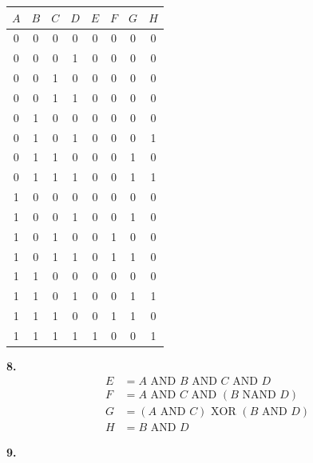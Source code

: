 \documentclass{article}
\begin{document}
    \begin{center}\begin{tabular}{| c | c | c | c | c | c | c | c |}
        \hline
        $A$ & $B$ & $C$ & $D$ & $E$ & $F$ & $G$ & $H$ \\
        \hline
        0 & 0 & 0 & 0 & 0 & 0 & 0 & 0 \\
        0 & 0 & 0 & 1 & 0 & 0 & 0 & 0 \\
        0 & 0 & 1 & 0 & 0 & 0 & 0 & 0 \\
        0 & 0 & 1 & 1 & 0 & 0 & 0 & 0 \\
        0 & 1 & 0 & 0 & 0 & 0 & 0 & 0 \\
        0 & 1 & 0 & 1 & 0 & 0 & 0 & 1 \\
        0 & 1 & 1 & 0 & 0 & 0 & 1 & 0 \\
        0 & 1 & 1 & 1 & 0 & 0 & 1 & 1 \\
        1 & 0 & 0 & 0 & 0 & 0 & 0 & 0 \\
        1 & 0 & 0 & 1 & 0 & 0 & 1 & 0 \\
        1 & 0 & 1 & 0 & 0 & 1 & 0 & 0 \\
        1 & 0 & 1 & 1 & 0 & 1 & 1 & 0 \\
        1 & 1 & 0 & 0 & 0 & 0 & 0 & 0 \\
        1 & 1 & 0 & 1 & 0 & 0 & 1 & 1 \\
        1 & 1 & 1 & 0 & 0 & 1 & 1 & 0 \\
        1 & 1 & 1 & 1 & 1 & 0 & 0 & 1 \\
        \hline
    \end{tabular}\end{center}

\medskip\noindent\textbf{8.}
\begin{align*}
    E &= A \text{ AND } B \text{ AND } C \text{ AND } D \\
    F &= A \text{ AND } C \text{ AND } (B \text{ NAND } D) \\
    G &= (A \text{ AND } C) \text{ XOR } (B \text{ AND } D) \\
    H &= B \text{ AND } D
\end{align*}

\newpage\noindent\textbf{9.}
\end{document}

